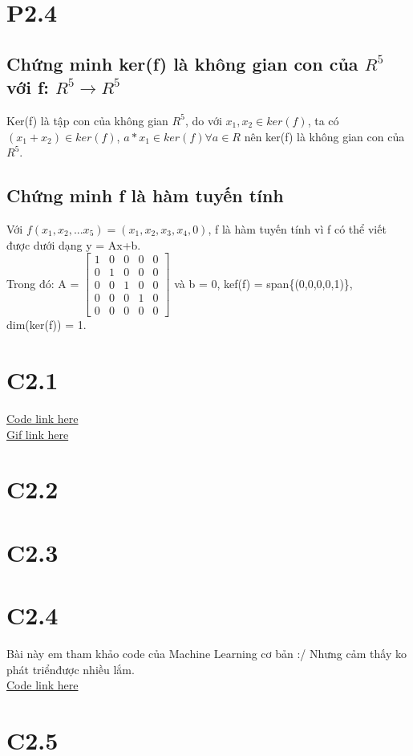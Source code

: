 \documentclass[a4paper,11pt]{article}
\theoremstyle{mytheor}
\begin{document}
\section*{P2.4}
\subsection*{Chứng minh ker(f) là không gian con của $R^5$ với f: $R^5\xrightarrow{}R^5$}
Ker(f) là tập con của không gian $R^5$, do với $x_1,x_2 \in ker(f)$, ta có $(x_1+x_2) \in ker(f)$, $a*x_1 \in ker(f) \forall a \in R$ nên ker(f) là không gian con của $R^5$.
\subsection*{Chứng minh f là hàm tuyến tính}
Với $f(x_1,x_2,...x_5) = (x_1,x_2,x_3,x_4,0)$, f là hàm tuyến tính vì f có thể viết được dưới dạng y = Ax+b.\\ Trong đó:
A = $\begin{bmatrix}1&0&0&0&0\\ 0&1&0&0&0 \\ 0&0&1&0&0 \\ 0&0&0&1&0 \\ 0&0&0&0&0 \end{bmatrix}$ và b = 0, 
kef(f) = span\{(0,0,0,0,1)\}, dim(ker(f)) = 1.
\section*{C2.1}
\href{https://colab.research.google.com/drive/1tHw-s6tutmhnt6YglAT1ct_C_fjuwaMu}{Code link here}
\\
\href{https://drive.google.com/open?id=1CMKWzSm0z0JqbRqxY4HaTwfDtyS0LSvh}{Gif link here}
\section*{C2.2}
\section*{C2.3}
\section*{C2.4}
Bài này em tham khảo code của Machine Learning cơ bản :/ Nhưng cảm thấy ko phát triểnđược nhiều lắm.\\
\href{https://colab.research.google.com/drive/1WbQtkARnAL2FdrglXXfmRoXAN40OF712}{Code link here}
\section*{C2.5}
\end{document}
